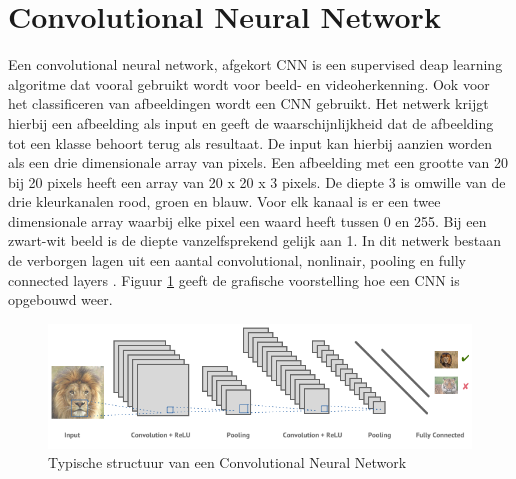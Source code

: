 \section{Convolutional Neural Network}
\label{sec:Convolutional Neural Network}

Een convolutional neural network, afgekort CNN is een supervised deap learning algoritme dat vooral gebruikt wordt voor beeld- en videoherkenning. Ook voor het classificeren van afbeeldingen wordt een CNN gebruikt. Het netwerk krijgt hierbij een afbeelding als input en geeft de waarschijnlijkheid dat de afbeelding tot een klasse behoort terug als resultaat. De input kan hierbij aanzien worden als een drie dimensionale array van pixels. Een afbeelding met een grootte van 20 bij 20 pixels heeft een array van 20 x 20 x 3 pixels. De diepte 3 is omwille van de drie kleurkanalen rood, groen en blauw. Voor elk kanaal is er een twee dimensionale array waarbij elke pixel een waard heeft tussen 0 en 255. Bij een zwart-wit beeld is de diepte vanzelfsprekend gelijk aan 1. In dit netwerk bestaan de verborgen lagen uit een aantal convolutional, nonlinair, pooling en fully connected layers \autocite{brohrer}. Figuur \ref{fig:structuur} geeft de grafische voorstelling hoe een CNN is opgebouwd weer.  
\begin{figure}
    \centering
        \includegraphics[width=1\textwidth]{img/convolutional_neural_network.png}
    \caption{Typische structuur van een Convolutional Neural Network \autocite{tejani}}
    \label{fig:structuur}
  \end{figure}

